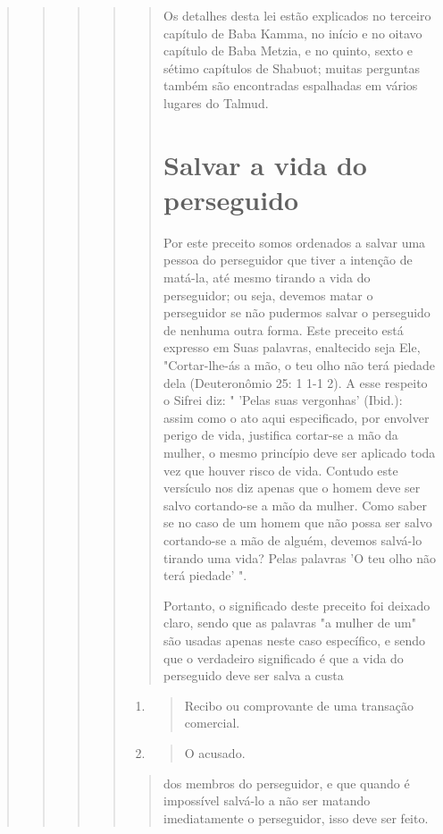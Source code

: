 \begin{quote}
\begin{quote}
\begin{quote}
\begin{quote}
\begin{quote}
Os detalhes desta lei estão explicados no terceiro capítulo de Baba
Kamma, no início e no oitavo capítulo de Baba Metzia, e no quinto, sexto
e sétimo capítulos de Shabuot; muitas perguntas também são encontradas
espa­lhadas em vários lugares do Talmud.

\section{Salvar a vida do perseguido}

Por este preceito somos ordenados a salvar uma pessoa do persegui­dor
que tiver a intenção de matá-la, até mesmo tirando a vida do
perseguidor; ou seja, devemos matar o perseguidor se não pudermos salvar
o perseguido de nenhuma outra forma. Este preceito está expresso em Suas
palavras, enalte­cido seja Ele, "Cortar-lhe-ás a mão, o teu olho não
terá piedade dela (Deutero­nômio 25: 1 1-1 2). A esse respeito o Sifrei
diz: " 'Pelas suas vergonhas' (Ibid.): assim como o ato aqui
especificado, por envolver perigo de vida, justifica cortar-se a mão da
mulher, o mesmo princípio deve ser aplicado toda vez que houver risco de
vida. Contudo este versículo nos diz apenas que o homem deve ser salvo
cortando-se a mão da mulher. Como saber se no caso de um homem que não
possa ser salvo cortando-se a mão de alguém, devemos salvá-lo tirando
uma vida? Pelas palavras 'O teu olho não terá piedade' ".

Portanto, o significado deste preceito foi deixado claro, sendo que as
palavras "a mulher de um" são usadas apenas neste caso específico, e
sendo que o verdadeiro significado é que a vida do perseguido deve ser
salva a custa
\end{quote}

\begin{enumerate}
\def\labelenumi{\arabic{enumi}.}
\setcounter{enumi}{227}
\item
 \begin{quote}
 Recibo ou comprovante de uma transação comercial.
 \end{quote}
\item
 \begin{quote}
 O acusado.
 \end{quote}
\end{enumerate}

\begin{quote}dos membros do perseguidor, e que quando é impossível salvá-lo a não ser
ma­tando imediatamente o perseguidor, isso deve ser feito.
\end{quote}


\end{quote}
\end{quote}
\end{quote}
\end{quote}

